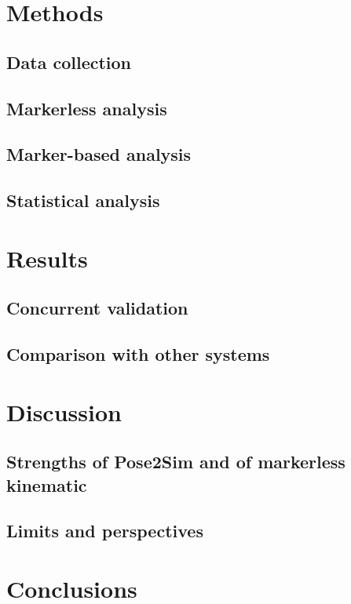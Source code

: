 \section{Methods}
\subsection{Data collection}
\blindtext

\subsection{Markerless analysis}
\blindtext

\subsection{Marker-based analysis}
\blindtext

\subsection{Statistical analysis}
\blindtext


\section{Results}
\subsection{Concurrent validation}
\blindtext

\subsection{Comparison with other systems}
\blindtext


\section{Discussion}
\subsection{Strengths of Pose2Sim and of markerless kinematic}
\blindtext

\subsection{Limits and perspectives}
\blindtext


\section{Conclusions}
\blindtext